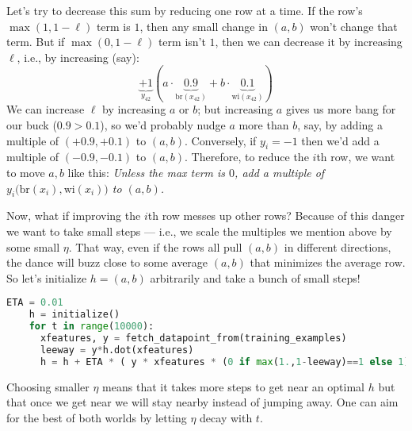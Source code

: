   Let's try to decrease this sum by reducing one row at a time.
  If the row's $\max(1,1-\ell)$ term is $1$, then
  any small change in $(a,b)$ won't change that term.
  But if $\max(0,1-\ell)$ term isn't $1$, then we can decrease it by increasing
  $\ell$, i.e., by increasing (say):
  $$
    \underbrace{+1}_{y_{42}}  (a \cdot \underbrace{0.9}_{\text{br}(x_{42})} + b \cdot\underbrace{0.1}_{\text{wi}(x_{42})})
  $$
  We can increase $\ell$ by increasing $a$ or $b$; but increasing $a$ gives us
  more bang for our buck ($0.9>0.1$), so we'd probably nudge $a$ more than $b$,
  say, by adding a multiple of $(+0.9, +0.1)$ to $(a, b)$.  Conversely, if
  ${y_i=-1}$ then we'd add a multiple of $(-0.9, -0.1)$ to $(a, b)$.
  Therefore, to reduce the $i$th row, we want to move $a, b$ like this:
    \emph{Unless the max term is $0$,
      add a multiple of $y_i ({\text{br}(x_{i})}, {\text{wi}(x_{i}))}$ to $(a,b)$.}

  Now, what if improving the $i$th row messes up other rows?  Because of this
  danger we want to take small steps --- i.e., we scale the multiples we
  mention above by some small $\eta$.  That way, even if the rows all pull
  $(a,b)$ in different directions, the dance will buzz close to some average
  $(a,b)$ that minimizes the average row.  So let's initialize
  $h=(a,b)$ arbitrarily and take a bunch of small steps!
  \begin{lstlisting}[language=Python, basicstyle=\footnotesize\ttfamily]
    ETA = 0.01
    h = initialize()
    for t in range(10000):
      xfeatures, y = fetch_datapoint_from(training_examples)
      leeway = y*h.dot(xfeatures)
      h = h + ETA * ( y * xfeatures * (0 if max(1.,1-leeway)==1 else 1) ) # update
  \end{lstlisting}
  Choosing smaller $\eta$ means that it takes more steps to get near an optimal
  $h$ but that once we get near we will stay nearby instead of jumping away.
  One can aim for the best of both worlds by letting $\eta$ decay with $t$.


